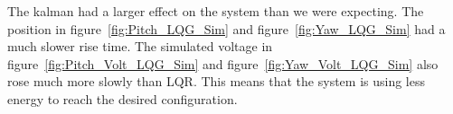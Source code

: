 The kalman had a larger effect on the system than we were expecting.  The position in figure~\ref{fig:Pitch_LQG_Sim} and  figure~\ref{fig:Yaw_LQG_Sim} had a much slower rise time.  The simulated voltage in figure~\ref{fig:Pitch_Volt_LQG_Sim} and figure~\ref{fig:Yaw_Volt_LQG_Sim} also rose much more slowly than LQR.  This means that the system is using less energy to reach the desired configuration. 




